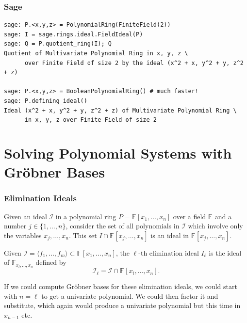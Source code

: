 \documentclass[9pt]{beamer}
\newcommand{\F}[1][]{\ensuremath{\mathbb{F}_{#1}}\xspace}
\newcommand{\I}{\ensuremath{\mathcal{I}}\xspace}
\newcommand{\gens}{\ensuremath{x_1,\dots,x_{n}}\xspace}
\newcommand{\ideal}[1]{\ensuremath{\langle #1\rangle}\xspace}
\begin{document}
\begin{frame}[fragile]
\frametitle{Sage}

\begin{lstlisting}
sage: P.<x,y,z> = PolynomialRing(FiniteField(2))
sage: I = sage.rings.ideal.FieldIdeal(P)
sage: Q = P.quotient_ring(I); Q
Quotient of Multivariate Polynomial Ring in x, y, z \
      over Finite Field of size 2 by the ideal (x^2 + x, y^2 + y, z^2 + z)

sage: P.<x,y,z> = BooleanPolynomialRing() # much faster!
sage: P.defining_ideal()
Ideal (x^2 + x, y^2 + y, z^2 + z) of Multivariate Polynomial Ring \
      in x, y, z over Finite Field of size 2
\end{lstlisting}


\end{frame}


\section{Solving Polynomial Systems with Gröbner Bases}
\label{sec:solvingmq}

\begin{frame}
\frametitle{Elimination Ideals}


Given an ideal $\I$ in a polynomial ring $P = \F{}[\gens]$ over a field $\F$ and a number $j \in \{1,\dots , n\}$, consider the set of all polynomials in $\I$ which involve only the variables $x_{j} ,\dots , x_{n}$. This set $I \cap \F{}[x_{j} , \dots , x_{n} ]$ is an ideal in $\F{}[x_{j},\dots,x_{n}]$.

\framebreak

\begin{definition}
\label{def:elimination-ideal}
Given $\I = \ideal{ f_1 ,\dots , f_m } \subset \F{}[\gens]$, the $\ell$-th elimination ideal $I_\ell$ is the ideal of $\F[x_{l} , \dots , x_n]$ defined by
\[ \I_\ell = \I \cap \F{}[x_{l} , \dots , x_{n} ].\]
\end{definition}

\framebreak

If we could compute Gröbner bases for these elimination ideals, we could start with $n=\ell$ to get a univariate polynomial. We could then factor it and substitute, which again would produce a univariate polynomial but this time in $x_{n-1}$ etc.
\end{frame}
\end{document}
